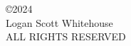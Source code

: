 
\begin{center}
\begin{singlespace}
\copyright 2024\\
Logan Scott Whitehouse \\
ALL RIGHTS RESERVED
\end{singlespace}
\end{center}

\clearpage
